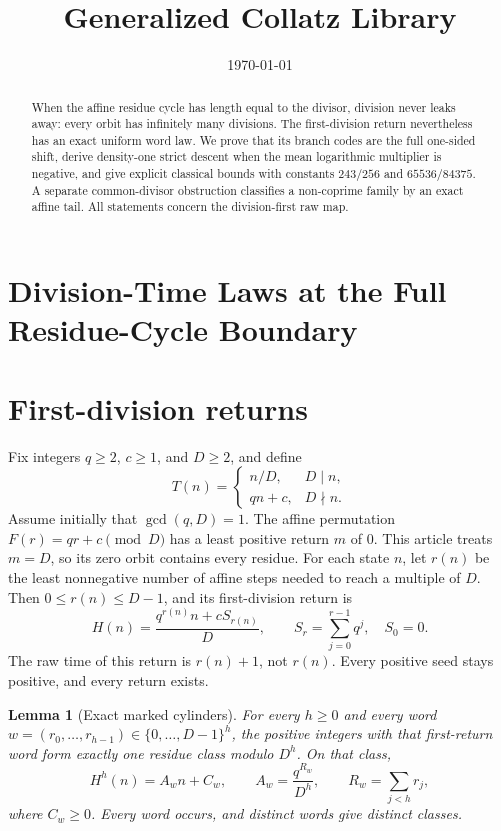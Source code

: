 \documentclass[11pt,letterpaper]{article}
\title{Generalized Collatz Library}
\author{}
\date{\today}
\newtheorem{lemma}[theorem]{Lemma}
\begin{document}
\maketitle
\section*{Division-Time Laws at the Full Residue-Cycle Boundary}

\begin{abstract}
When the affine residue cycle has length equal to the divisor, division never leaks away: every orbit has infinitely many divisions. The first-division return nevertheless has an exact uniform word law. We prove that its branch codes are the full one-sided shift, derive density-one strict descent when the mean logarithmic multiplier is negative, and give explicit classical bounds with constants \(243/256\) and \(65536/84375\). A separate common-divisor obstruction classifies a non-coprime family by an exact affine tail. All statements concern the division-first raw map.
\end{abstract}

\section{First-division returns}

Fix integers \(q\ge2\), \(c\ge1\), and \(D\ge2\), and define
\[
T(n)=
\begin{cases}
n/D,&D\mid n,\\
qn+c,&D\nmid n.
\end{cases}
\]
Assume initially that \(\gcd(q,D)=1\). The affine permutation
\(F(r)=qr+c\pmod D\) has a least positive return \(m\) of \(0\).
This article treats \(m=D\), so its zero orbit contains every residue.
For each state \(n\), let \(r(n)\) be the least nonnegative number of affine
steps needed to reach a multiple of \(D\).
Then \(0\le r(n)\le D-1\), and its first-division return is
\[
H(n)=\frac{q^{r(n)}n+cS_{r(n)}}{D},
\qquad
S_r=\sum_{j=0}^{r-1}q^j,\quad S_0=0.
\]
The raw time of this return is \(r(n)+1\), not \(r(n)\).
Every positive seed stays positive, and every return exists.

\begin{lemma}[Exact marked cylinders]
\label{lem:cylinders}
For every \(h\ge0\) and every word
\(w=(r_0,\ldots,r_{h-1})\in\{0,\ldots,D-1\}^h\), the positive integers
with that first-return word form exactly one residue class modulo \(D^h\).
On that class,
\[
H^h(n)=A_w n+C_w,\qquad
A_w=\frac{q^{R_w}}{D^h},\qquad R_w=\sum_{j<h}r_j,
\]
where \(C_w\ge0\). Every word occurs, and distinct words give distinct classes.
\end{lemma}
\end{document}

